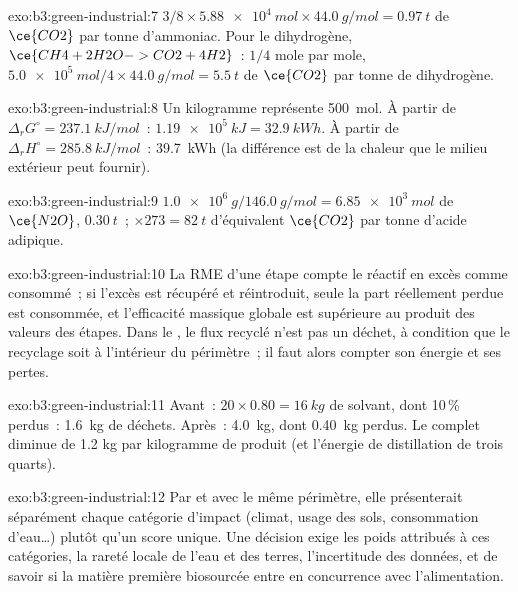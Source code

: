 \begin{solution}{exo:b3:green-industrial:7}
$3/8 \times \qty{5.88e4}{mol} \times \qty{44.0}{g/mol} = \qty{0.97}{t}$ de $\ce{CO2}$ par tonne d'ammoniac. Pour le dihydrogène, $\ce{CH4 + 2H2O -> CO2 + 4H2}$~:
$1/4$ mole par mole, $\qty{5.0e5}{mol}/4 \times \qty{44.0}{g/mol} = \qty{5.5}{t}$ de $\ce{CO2}$ par tonne de dihydrogène.
\end{solution}

\begin{solution}{exo:b3:green-industrial:8}
Un kilogramme représente \qty{500}{mol}. À partir de $\Delta_rG^\circ = \qty{237.1}{kJ/mol}$~: $\qty{1.19e5}{kJ} = \qty{32.9}{kWh}$. À partir de $\Delta_rH^\circ = \qty{285.8}{kJ/mol}$~: \qty{39.7}{kWh}
(la différence est de la chaleur que le milieu extérieur peut fournir).
\end{solution}

\begin{solution}{exo:b3:green-industrial:9}
$\qty{1.0e6}{g}/\qty{146.0}{g/mol} = \qty{6.85e3}{mol}$ de $\ce{N2O}$, $\qty{0.30}{t}$~; $\times 273 = \qty{82}{t}$ d'équivalent $\ce{CO2}$ par tonne d'acide adipique.
\end{solution}

\begin{solution}{exo:b3:green-industrial:10}
La RME d'une étape compte le réactif en excès comme consommé~; si l'excès
est récupéré et réintroduit, seule la part réellement perdue est
consommée, et l'efficacité massique globale est supérieure au produit des
valeurs des étapes. Dans le , le flux recyclé n'est pas un
déchet, à condition que le recyclage soit à l'intérieur du périmètre~; il
faut alors compter son énergie et ses pertes.
\end{solution}

\begin{solution}{exo:b3:green-industrial:11}
Avant~: $20 \times 0.80 = \qty{16}{kg}$ de solvant, dont 10\,\% perdus~: \qty{1.6}{kg} de déchets. Après~: \qty{4.0}{kg}, dont \qty{0.40}{kg} perdus. Le
 complet diminue de 1.2 kg par kilogramme de produit (et l'énergie
de distillation de trois quarts).
\end{solution}

\begin{solution}{exo:b3:green-industrial:12}
Par  et avec le même périmètre, elle présenterait
séparément chaque catégorie d'impact (climat, usage des sols, consommation
d'eau\dots) plutôt qu'un score unique. Une décision exige les poids
attribués à ces catégories, la rareté locale de l'eau et des terres,
l'incertitude des données, et de savoir si la matière première biosourcée
entre en concurrence avec l'alimentation.
\end{solution}

